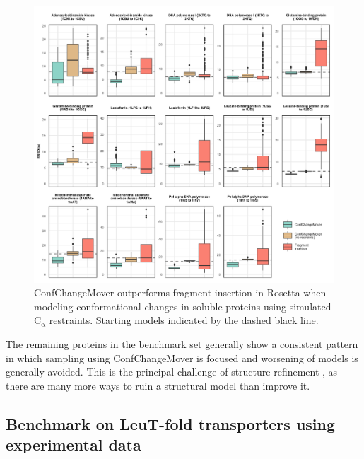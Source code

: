 \begin{figure}[h!]
\centering
\includegraphics[width=6.5in]{Figures/ccm_soluble.pdf}
 \caption[ConfChangeMover outperforms fragment insertion in Rosetta when modeling conformational changes in soluble proteins using simulated $\mathrm{C_{\upalpha}}$ restraints.]{ConfChangeMover outperforms fragment insertion in Rosetta when modeling conformational changes in soluble proteins using simulated $\mathrm{C_{\upalpha}}$ restraints. Starting models indicated by the dashed black line. }
\label{fig:ccm_soluble}
\end{figure}

The remaining proteins in the benchmark set generally show a consistent pattern in which sampling using ConfChangeMover is focused and worsening of models is generally avoided. This is the principal challenge of structure refinement \citep*{Park2018}, as there are many more ways to ruin a structural model than improve it.

\subsection{Benchmark on LeuT-fold transporters using experimental data}

